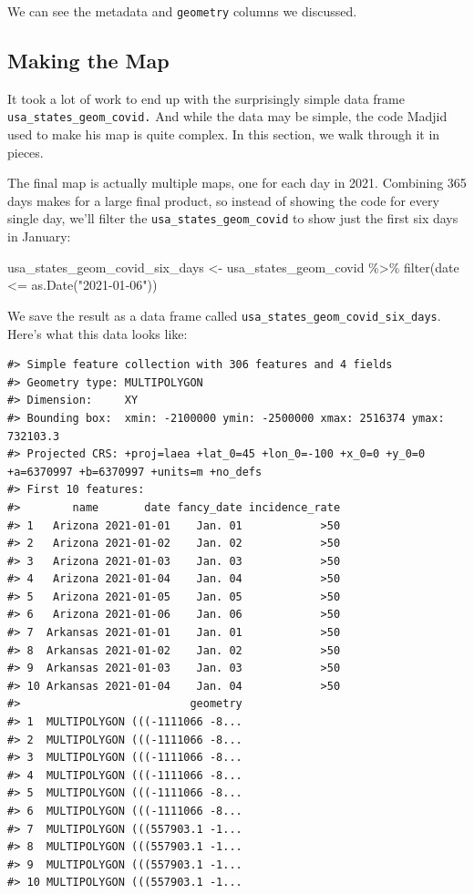\documentclass[
]{book}
\newenvironment{Shaded}{\begin{snugshade}}{\end{snugshade}}
\newcommand{\FunctionTok}[1]{\textcolor[rgb]{0.00,0.00,0.00}{#1}}
\newcommand{\NormalTok}[1]{#1}
\newcommand{\OtherTok}[1]{\textcolor[rgb]{0.56,0.35,0.01}{#1}}
\newcommand{\SpecialCharTok}[1]{\textcolor[rgb]{0.00,0.00,0.00}{#1}}
\newcommand{\StringTok}[1]{\textcolor[rgb]{0.31,0.60,0.02}{#1}}
\begin{document}
We can see the metadata and \texttt{geometry} columns we discussed.

\hypertarget{making-the-map}{%
\subsection*{Making the Map}\label{making-the-map}}

It took a lot of work to end up with the surprisingly simple data frame \texttt{usa\_states\_geom\_covid.} And while the data may be simple, the code Madjid used to make his map is quite complex. In this section, we walk through it in pieces.

The final map is actually multiple maps, one for each day in 2021. Combining 365 days makes for a large final product, so instead of showing the code for every single day, we'll filter the \texttt{usa\_states\_geom\_covid} to show just the first six days in January:

\begin{Shaded}
\begin{Highlighting}[]
\NormalTok{usa\_states\_geom\_covid\_six\_days }\OtherTok{\textless{}{-}}\NormalTok{ usa\_states\_geom\_covid }\SpecialCharTok{\%\textgreater{}\%}
  \FunctionTok{filter}\NormalTok{(date }\SpecialCharTok{\textless{}=} \FunctionTok{as.Date}\NormalTok{(}\StringTok{"2021{-}01{-}06"}\NormalTok{))}
\end{Highlighting}
\end{Shaded}

We save the result as a data frame called \texttt{usa\_states\_geom\_covid\_six\_days}. Here's what this data looks like:

\begin{verbatim}
#> Simple feature collection with 306 features and 4 fields
#> Geometry type: MULTIPOLYGON
#> Dimension:     XY
#> Bounding box:  xmin: -2100000 ymin: -2500000 xmax: 2516374 ymax: 732103.3
#> Projected CRS: +proj=laea +lat_0=45 +lon_0=-100 +x_0=0 +y_0=0 +a=6370997 +b=6370997 +units=m +no_defs
#> First 10 features:
#>        name       date fancy_date incidence_rate
#> 1   Arizona 2021-01-01    Jan. 01            >50
#> 2   Arizona 2021-01-02    Jan. 02            >50
#> 3   Arizona 2021-01-03    Jan. 03            >50
#> 4   Arizona 2021-01-04    Jan. 04            >50
#> 5   Arizona 2021-01-05    Jan. 05            >50
#> 6   Arizona 2021-01-06    Jan. 06            >50
#> 7  Arkansas 2021-01-01    Jan. 01            >50
#> 8  Arkansas 2021-01-02    Jan. 02            >50
#> 9  Arkansas 2021-01-03    Jan. 03            >50
#> 10 Arkansas 2021-01-04    Jan. 04            >50
#>                          geometry
#> 1  MULTIPOLYGON (((-1111066 -8...
#> 2  MULTIPOLYGON (((-1111066 -8...
#> 3  MULTIPOLYGON (((-1111066 -8...
#> 4  MULTIPOLYGON (((-1111066 -8...
#> 5  MULTIPOLYGON (((-1111066 -8...
#> 6  MULTIPOLYGON (((-1111066 -8...
#> 7  MULTIPOLYGON (((557903.1 -1...
#> 8  MULTIPOLYGON (((557903.1 -1...
#> 9  MULTIPOLYGON (((557903.1 -1...
#> 10 MULTIPOLYGON (((557903.1 -1...
\end{verbatim}
\end{document}
